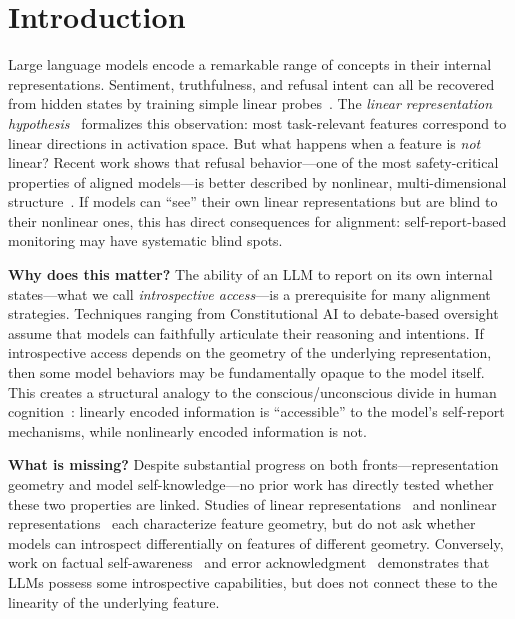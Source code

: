 \section{Introduction}
\label{sec:intro}

Large language models encode a remarkable range of concepts in their internal representations. Sentiment, truthfulness, and refusal intent can all be recovered from hidden states by training simple linear probes~\cite{marks2023geometry, li2023inference, arditi2024refusal}. The \emph{linear representation hypothesis}~\cite{park2023linear} formalizes this observation: most task-relevant features correspond to linear directions in activation space. But what happens when a feature is \emph{not} linear? Recent work shows that refusal behavior---one of the most safety-critical properties of aligned models---is better described by nonlinear, multi-dimensional structure~\cite{hildebrandt2025refusal, engels2025not}. If models can ``see'' their own linear representations but are blind to their nonlinear ones, this has direct consequences for alignment: self-report-based monitoring may have systematic blind spots.

{\bf Why does this matter?} The ability of an LLM to report on its own internal states---what we call \emph{introspective access}---is a prerequisite for many alignment strategies. Techniques ranging from Constitutional AI to debate-based oversight assume that models can faithfully articulate their reasoning and intentions. If introspective access depends on the geometry of the underlying representation, then some model behaviors may be fundamentally opaque to the model itself. This creates a structural analogy to the conscious/unconscious divide in human cognition~\cite{dehaene2011experimental}: linearly encoded information is ``accessible'' to the model's self-report mechanisms, while nonlinearly encoded information is not.

{\bf What is missing?} Despite substantial progress on both fronts---representation geometry and model self-knowledge---no prior work has directly tested whether these two properties are linked. Studies of linear representations~\cite{marks2023geometry, park2023linear, burns2022discovering} and nonlinear representations~\cite{hildebrandt2025refusal, engels2025not} each characterize feature geometry, but do not ask whether models can introspect differentially on features of different geometry. Conversely, work on factual self-awareness~\cite{tamoyan2025factual} and error acknowledgment~\cite{yang2025when} demonstrates that LLMs possess some introspective capabilities, but does not connect these to the linearity of the underlying feature.


